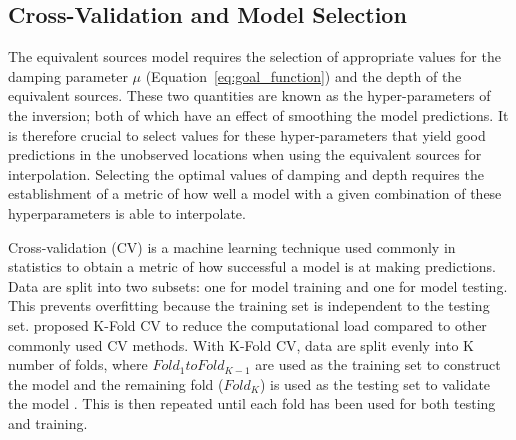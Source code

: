 \subsection{Cross-Validation and Model Selection}

The equivalent sources model requires the selection of appropriate values for the damping parameter $\mu$ (Equation~\ref{eq:goal_function}) and the depth of the equivalent sources. 
These two quantities are known as the hyper-parameters of the inversion; both of which have an effect of smoothing the model predictions. It is therefore crucial to select values for these hyper-parameters that yield good predictions in the unobserved locations when using the equivalent sources for interpolation. Selecting the optimal values of damping and depth requires the establishment of a metric of how well a model with a given combination of these hyperparameters is able to interpolate.

Cross-validation (CV) is a machine learning technique used commonly in statistics to obtain a metric of how successful a model is at making predictions. Data are split into two subsets: one for model training and one for model testing. This prevents overfitting because the training set is independent to the testing set. \citet{Geisser1975} proposed K-Fold CV to reduce the computational load compared to other commonly used CV methods. With K-Fold CV, data are split evenly into K number of folds, where $Fold_1 to Fold_{K-1}$ are used as the training set to construct the model and the remaining fold ($Fold_K$) is used as the testing set to validate the model \citep{Jung2017}. This is then repeated until each fold has been used for both testing and training.

